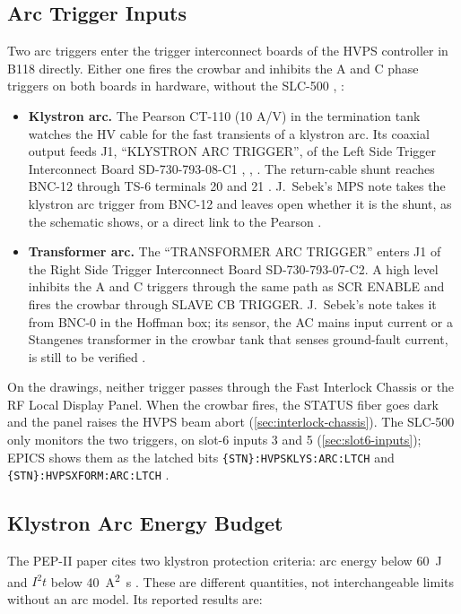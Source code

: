 \subsection{Arc Trigger Inputs}\label{sec:arc-triggers}

Two arc triggers enter the trigger interconnect boards of the HVPS controller in B118 directly. Either one fires the crowbar and inhibits the A and C phase triggers on both boards in hardware, without the SLC-500 , :

\begin{itemize}
\tightlist
\item
  \textbf{Klystron arc.} The Pearson CT-110 (10 A/V) in the termination tank watches the HV cable for the fast transients of a klystron arc. Its coaxial output feeds J1, ``KLYSTRON ARC TRIGGER'', of the Left Side Trigger Interconnect Board SD-730-793-08-C1 , , . The return-cable shunt reaches BNC-12 through TS-6 terminals 20 and 21 . J.~Sebek's MPS note takes the klystron arc trigger from BNC-12 and leaves open whether it is the shunt, as the schematic shows, or a direct link to the Pearson .
\item
  \textbf{Transformer arc.} The ``TRANSFORMER ARC TRIGGER'' enters J1 of the Right Side Trigger Interconnect Board SD-730-793-07-C2. A high level inhibits the A and C triggers through the same path as SCR ENABLE and fires the crowbar through SLAVE CB TRIGGER. J.~Sebek's note takes it from BNC-0 in the Hoffman box; its sensor, the AC mains input current or a Stangenes transformer in the crowbar tank that senses ground-fault current, is still to be verified .
\end{itemize}

On the drawings, neither trigger passes through the Fast Interlock Chassis or the RF Local Display Panel. When the crowbar fires, the STATUS fiber goes dark and the panel raises the HVPS beam abort (\cref{sec:interlock-chassis}). The SLC-500 only monitors the two triggers, on slot-6 inputs 3 and 5 (\cref{sec:slot6-inputs}); EPICS shows them as the latched bits \texttt{\{STN\}:\allowbreak{}HVPSKLYS:\allowbreak{}ARC:\allowbreak{}LTCH} and \texttt{\{STN\}:\allowbreak{}HVPSXFORM:\allowbreak{}ARC:\allowbreak{}LTCH} .

\subsection{Klystron Arc Energy Budget}

The PEP-II paper cites two klystron protection criteria: arc energy below \qty{60}{\joule} and $I^2t$ below \qty{40}{\ampere\squared\second} . These are different quantities, not interchangeable limits without an arc model. Its reported results are:

